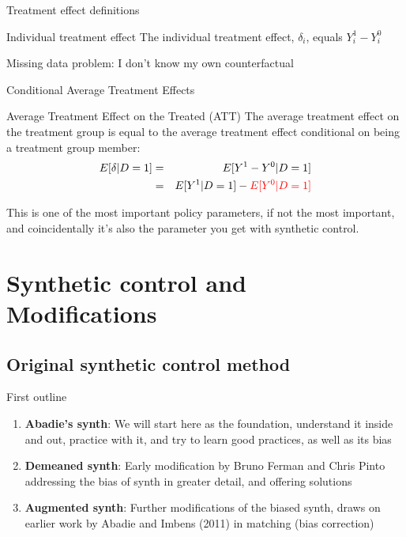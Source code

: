 \documentclass{beamer}
\begin{document}
\begin{frame}{Treatment effect definitions}


	\begin{block}{Individual treatment effect}
	    The individual treatment effect,  $\delta_i$, equals $Y_i^1-Y_i^0$
	\end{block}

Missing data problem:  I don't know my own counterfactual
	
\end{frame}


\begin{frame}{Conditional Average Treatment Effects}	
	\begin{block}{Average Treatment Effect on the Treated (ATT)}
	The average treatment effect on the treatment group is equal to the average treatment effect conditional on being a treatment group member:
		\begin{eqnarray*}
		E[\delta|D=1]&=&E[Y^1-Y^0|D=1] \nonumber \\
		&=&E[Y^1|D=1]-\textcolor{red}{E[Y^0|D=1]}
		\end{eqnarray*}
	\end{block}
	
	\bigskip

This is one of the most important policy parameters, if not the most important, and coincidentally it's also the parameter you get with synthetic control.  

	
\end{frame}




\section{Synthetic control and Modifications}

\subsection{Original synthetic control method}

\begin{frame}{First outline}

\begin{enumerate}
\item \textbf{Abadie's synth}: We will start here as the foundation, understand it inside and out, practice with it, and try to learn good practices, as well as its bias
\item \textbf{Demeaned synth}: Early modification by Bruno Ferman and Chris Pinto addressing the bias of synth in greater detail, and offering solutions
\item \textbf{Augmented synth}: Further modifications of the biased synth, draws on earlier work by Abadie and Imbens (2011) in matching (bias correction)
\end{enumerate}

\end{frame}
\end{document}
